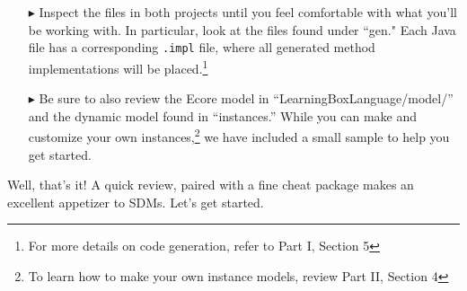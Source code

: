 \begin{itemize}

\item[$\blacktriangleright$] Inspect the files in both projects until you feel comfortable with what you'll be working with. In particular, look at the files
found under ``gen." Each Java file has a corresponding \texttt{.impl} file, where all generated method implementations will be placed.\footnote{For
more details on code generation, refer to Part I, Section 5} 

\item[$\blacktriangleright$] Be sure to also review the Ecore model in ``LearningBoxLanguage/model/'' and the dynamic model found in ``instances.'' While
you can make and customize your own instances,\footnote{To learn how to make your own instance models, review Part II, Section 4} we have included a small
sample to help you get started.

\end{itemize}

Well, that's it! A quick review, paired with a fine cheat package makes an excellent appetizer to SDMs. Let's get started.